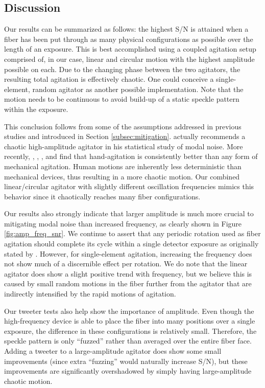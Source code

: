 \subsection{Discussion}
\label{subsec:discussion}

Our results can be summarized as follows: the highest S/N is attained when a fiber has been put through as many physical configurations as possible over the length of an exposure. This is best accomplished using a coupled agitation setup comprised of, in our case, linear and circular motion with the highest amplitude possible on each. Due to the changing phase between the two agitators, the resulting total agitation is effectively chaotic. One could conceive a single-element, random agitator as another possible implementation. Note that the motion needs to be continuous to avoid build-up of a static speckle pattern within the exposure.

This conclusion follows from some of the assumptions addressed in previous studies and introduced in Section \ref{subsec:mitigation}. \citet{grupp_nature_2003} actually recommends a chaotic high-amplitude agitator in his statistical study of modal noise. More recently, \citet{lemke_modal_2011}, \citet{mccoy_optical_2012}, \citet{mahadevan_suppression_2014}, and \citet{roy_scrambling_2014} find that hand-agitation is consistently better than any form of mechanical agitation. Human motions are inherently less deterministic than mechanical devices, thus resulting in a more chaotic motion. Our combined linear/circular agitator with slightly different oscillation frequencies mimics this behavior since it chaotically reaches many fiber configurations.

Our results also strongly indicate that larger amplitude is much more crucial to mitigating modal noise than increased frequency, as clearly shown in Figure \ref{fig:amp_freq_snr}. We continue to assert that any periodic rotation used as fiber agitation should complete its cycle within a single detector exposure as originally stated by \citet{baudrand_modal_2001}. However, for single-element agitation, increasing the frequency does not show much of a discernible effect per rotation. We do note that the linear agitator does show a slight positive trend with frequency, but we believe this is caused by small random motions in the fiber further from the agitator that are indirectly intensified by the rapid motions of agitation.

Our tweeter tests also help show the importance of amplitude. Even though the high-frequency device is able to place the fiber into many positions over a single exposure, the difference in these configurations is relatively small. Therefore, the speckle pattern is only ``fuzzed'' rather than averaged over the entire fiber face. Adding a tweeter to a large-amplitude agitator does show some small improvements (since extra ``fuzzing'' would naturally increase S/N), but these improvements are significantly overshadowed by simply having large-amplitude chaotic motion.

